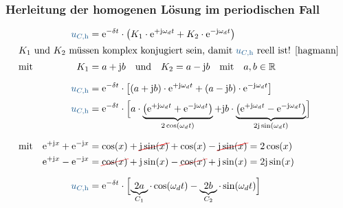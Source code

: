 \subsubsection{Herleitung der homogenen Lösung im periodischen Fall}
\label{sec:schaltvorgaengezeitbereich:exkurse:herleitung}
%
\begin{frame}[t]
\ifvmode\vspace*{-\baselineskip}\setlength{\parskip}{0ex}\fi%
\begin{align}
    &&
        \ecv{u_{C,\mathrm{h}}} &= \mathrm{e}^{-\delta t} \cdot \left( K_1 \cdot \mathrm{e}^{+\mathrm{j}\omega_d t} + K_2 \cdot \mathrm{e}^{-\mathrm{j}\omega_d t} \right) \nonumber\\
\intertext{$K_1$ und $K_2$ müssen komplex konjugiert sein, damit $\ecv{u_{C,\mathrm{h}}}$ reell ist! \s{\cite[Vgl. S. 379]{hagmann}}}
&\text{mit}&
        K_1 &= a + \mathrm{j} b \mathrlap{\quad\text{und}\quad K_2 = a - \mathrm{j} b\quad\text{mit}\quad a,b \in \mathbb{R}} \nonumber\\[6pt]
    &&
        \ecv{u_{C,\mathrm{h}}} &= \mathrm{e}^{-\delta t} \cdot \left[ (a + \mathrm{j} b) \cdot \mathrm{e}^{+\mathrm{j}\omega_d t} + (a - \mathrm{j} b) \cdot \mathrm{e}^{-\mathrm{j}\omega_d t} \right] \nonumber\\[2pt]
    &&
        \ecv{u_{C,\mathrm{h}}} &= \mathrm{e}^{-\delta t} \cdot
            \left[\vphantom{\Big|}
            \smash{ a \cdot
            \underbrace{\left(
                \mathrm{e}^{+\mathrm{j}\omega_d t} + \mathrm{e}^{-\mathrm{j}\omega_d t}
            \right)}_{2\cos(\omega_d t)}
            + \mathrm{j} b \cdot
            \underbrace{\left(
                \mathrm{e}^{+\mathrm{j}\omega_d t} - \mathrm{e}^{-\mathrm{j}\omega_d t}
            \right)}_{2\mathrm{j}\sin(\omega_d t)}
            }\right] \nonumber\\[20pt]
    &\text{mit}&
        \mathrm{e}^{+\mathrm{j}x} + \mathrm{e}^{-\mathrm{j}x} &= \cos(x) + \redcancel{\mathrm{j}\sin(x)} + \cos(x) - \redcancel{\mathrm{j}\sin(x)} = 2\cos(x) \nonumber\\
    &&
        \mathrm{e}^{+\mathrm{j}x} - \mathrm{e}^{-\mathrm{j}x} &= \redcancel{\cos(x)} + \mathrm{j}\sin(x) - \redcancel{\cos(x)} + \mathrm{j}\sin(x) = 2\mathrm{j}\sin(x) \nonumber\\[6pt]
    &&
        \ecv{u_{C,\mathrm{h}}} &= \mathrm{e}^{-\delta t} \cdot
            \left[\vphantom{\Big|}\smash{
            \underbrace{2a}_{C_1} \cdot \cos(\omega_d t) - \underbrace{2b}_{C_2} \cdot \sin(\omega_d t)
            }\right]
    \label{eq:dgl:rlc:homolsg:periodisch:herleitung}
\end{align}%
\end{frame}%
